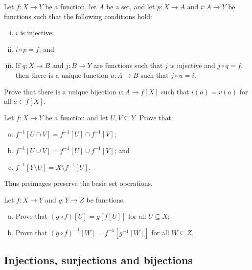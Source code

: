 \begin{chapex}
Let $f : X \to Y$ be a function, let $A$ be a set, and let $p : X \to A$ and $i : A \to Y$ be functions such that the following conditions hold:
\begin{enumerate}[(i)]
\item $i$ is injective;
\item $i \circ p = f$; and
\item If $q : X \to B$ and $j : B \to Y$ are functions such that $j$ is injective and $j \circ q = f$, then there is a unique function $u : A \to B$ such that $j \circ u = i$.
\end{enumerate}
Prove that there is a unique bijection $v : A \to f[X]$ such that $i(a)=v(a)$ for all $a \in f[X]$.
\end{chapex}

\begin{chapex}
Let $f : X \to Y$ be a function and let $U, V \subseteq Y$. Prove that:
\begin{enumerate}[(a)]
\item $f^{-1}[U \cap V] = f^{-1}[U] \cap f^{-1}[V]$;
\item $f^{-1}[U \cup V] = f^{-1}[U] \cup f^{-1}[V]$; and
\item $f^{-1}[Y \setminus U] = X \setminus f^{-1}[U]$.
\end{enumerate}
Thus preimages preserve the basic set operations.
\end{chapex}

\begin{chapex}
Let $f : X \to Y$ and $g : Y \to Z$ be functions.
\begin{enumerate}[(a)]
\item Prove that $(g \circ f)[U] = g[f[U]]$ for all $U \subseteq X$;
\item Prove that $(g \circ f)^{-1}[W] = f^{-1}[g^{-1}[W]]$ for all $W \subseteq Z$.
\end{enumerate}
\end{chapex}

\subsection*{Injections, surjections and bijections}

